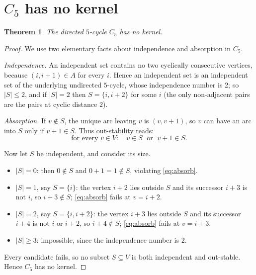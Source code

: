 \documentclass[11pt]{article}
\newtheorem{theorem}{Theorem}
\theoremstyle{definition}
\theoremstyle{remark}
\newcommand{\Cfive}{C_5}
\begin{document}
\section{$\Cfive$ has no kernel}

\begin{theorem}\label{thm:no-kernel}
The directed $5$-cycle $\Cfive$ has no kernel.
\end{theorem}

\begin{proof}
We use two elementary facts about independence and absorption in $\Cfive$.

\emph{Independence.} An independent set contains no two cyclically consecutive
vertices, because $(i, i+1) \in A$ for every $i$. Hence an independent set is an
independent set of the underlying undirected $5$-cycle, whose independence
number is $2$; so $|S| \le 2$, and if $|S| = 2$ then $S = \{i, i+2\}$ for some
$i$ (the only non-adjacent pairs are the pairs at cyclic distance $2$).

\emph{Absorption.} If $v \notin S$, the unique arc leaving $v$ is
$(v, v+1)$, so $v$ can have an arc into $S$ only if $v + 1 \in S$. Thus
out-stability reads:
\begin{equation}\label{eq:absorb}
\text{for every } v \in V: \quad v \in S \;\text{ or }\; v + 1 \in S .
\end{equation}

Now let $S$ be independent, and consider its size.

\begin{itemize}
\item $|S| = 0$: then $0 \notin S$ and $0 + 1 = 1 \notin S$, violating
      \eqref{eq:absorb}.
\item $|S| = 1$, say $S = \{i\}$: the vertex $i+2$ lies outside $S$ and its
      successor $i+3$ is not $i$, so $i + 3 \notin S$; \eqref{eq:absorb} fails at
      $v = i+2$.
\item $|S| = 2$, say $S = \{i, i+2\}$: the vertex $i + 3$ lies outside $S$ and
      its successor $i+4$ is not $i$ or $i+2$, so $i+4 \notin S$;
      \eqref{eq:absorb} fails at $v = i + 3$.
\item $|S| \ge 3$: impossible, since the independence number is $2$.
\end{itemize}

Every candidate fails, so no subset $S \subseteq V$ is both independent and
out-stable. Hence $\Cfive$ has no kernel.
\end{proof}
\end{document}
